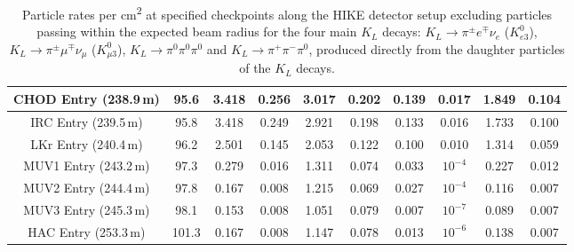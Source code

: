 \documentclass[../../main.tex]{subfiles}
\begin{document}
\begin{table}[htbp]
{\begin{tabular}{|cl|clclclcl|}
        CHOD Entry (238.9\,m) & \multicolumn{1}{|c|}{95.6}& \multicolumn{1}{c|}{3.418} & \multicolumn{1}{c|}{0.256} & \multicolumn{1}{c|}{3.017} & \multicolumn{1}{c|}{0.202} & \multicolumn{1}{c|}{0.139} & \multicolumn{1}{c|}{0.017} & \multicolumn{1}{c|}{1.849} & \multicolumn{1}{c|}{0.104} \\ \hline
        IRC Entry (239.5\,m) & \multicolumn{1}{|c|}{95.8}& \multicolumn{1}{c|}{3.418} & \multicolumn{1}{c|}{0.249} & \multicolumn{1}{c|}{2.921} & \multicolumn{1}{c|}{0.198} & \multicolumn{1}{c|}{0.133} & \multicolumn{1}{c|}{0.016} & \multicolumn{1}{c|}{1.733} & \multicolumn{1}{c|}{0.100}\\ \hline
        LKr Entry (240.4\,m) & \multicolumn{1}{|c|}{96.2}& \multicolumn{1}{c|}{2.501} & \multicolumn{1}{c|}{0.145} & \multicolumn{1}{c|}{2.053} & \multicolumn{1}{c|}{0.122} & \multicolumn{1}{c|}{0.100} & \multicolumn{1}{c|}{0.010} & \multicolumn{1}{c|}{1.314} & \multicolumn{1}{c|}{0.059}\\ \hline
        MUV1 Entry (243.2\,m) & \multicolumn{1}{|c|}{97.3}& \multicolumn{1}{c|}{0.279} & \multicolumn{1}{c|}{0.016} & \multicolumn{1}{c|}{1.311} & \multicolumn{1}{c|}{0.074} & \multicolumn{1}{c|}{0.033} & \multicolumn{1}{c|}{$10^{-4}$} & \multicolumn{1}{c|}{0.227} & \multicolumn{1}{c|}{0.012}\\ \hline
        MUV2 Entry (244.4\,m) & \multicolumn{1}{|c|}{97.8}& \multicolumn{1}{c|}{0.167} & \multicolumn{1}{c|}{0.008} & \multicolumn{1}{c|}{1.215} & \multicolumn{1}{c|}{0.069} & \multicolumn{1}{c|}{0.027} & \multicolumn{1}{c|}{$10^{-4}$} & \multicolumn{1}{c|}{0.116} & \multicolumn{1}{c|}{0.007}\\ \hline
        MUV3 Entry (245.3\,m) & \multicolumn{1}{|c|}{98.1}& \multicolumn{1}{c|}{0.153} & \multicolumn{1}{c|}{0.008} & \multicolumn{1}{c|}{1.051} & \multicolumn{1}{c|}{0.079} & \multicolumn{1}{c|}{0.007} & \multicolumn{1}{c|}{$10^{-7}$} & \multicolumn{1}{c|}{0.089} & \multicolumn{1}{c|}{0.007}\\ \hline
        HAC Entry (253.3\,m) & \multicolumn{1}{|c|}{101.3} & \multicolumn{1}{c|}{0.167} & \multicolumn{1}{c|}{0.008} & \multicolumn{1}{c|}{1.147} & \multicolumn{1}{c|}{0.078} & \multicolumn{1}{c|}{0.013} & \multicolumn{1}{c|}{$10^{-6}$} & \multicolumn{1}{c|}{0.138} & \multicolumn{1}{c|}{0.007}\\ \hline
        \end{tabular}
        }
        \caption{Particle rates per \si{\centi\metre\squared} at specified checkpoints along the HIKE detector setup excluding particles passing within the expected beam radius for the four main $K_L$ decays: $ K_L \to \pi^{\pm} e^{\mp} \nu_e$ ($K_{e3}^{0}$), $ K_L \to \pi^{\pm} \mu^{\mp} \nu_{\mu}$ ($K_{\mu 3}^{0}$), $ K_L \to \pi^{0} \pi^{0} \pi^{0}$ and $ K_L \to \pi^{+} \pi^{-} \pi^{0}$, produced directly from the daughter particles of the $K_L$ decays. }%
        \label{tab:RatesAtZBeamHole}
    \end{table}
    
\end{document}
